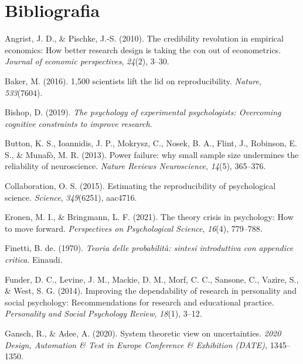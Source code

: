 \documentclass[
  letterpaper,
  DIV=11,
  numbers=noendperiod]{scrreprt}
\newlength{\cslhangindent}
\newenvironment{CSLReferences}[2] %
 {\begin{list}{}{%
  \setlength{\itemindent}{0pt}
  \setlength{\leftmargin}{0pt}
  \setlength{\parsep}{0pt}
  \ifodd #1
   \setlength{\leftmargin}{\cslhangindent}
   \setlength{\itemindent}{-1\cslhangindent}
  \fi
  \setlength{\itemsep}{#2\baselineskip}}}
 {\end{list}}
\theoremstyle{definition}
\theoremstyle{remark}
\begin{document}
\section*{Bibliografia}\label{bibliografia-4}


\label{refs}
\begin{CSLReferences}{1}{0}
Angrist, J. D., \& Pischke, J.-S. (2010). The credibility revolution in
empirical economics: How better research design is taking the con out of
econometrics. \emph{Journal of economic perspectives}, \emph{24}(2),
3--30.

Baker, M. (2016). 1,500 scientists lift the lid on reproducibility.
\emph{Nature}, \emph{533}(7604).

Bishop, D. (2019). \emph{The psychology of experimental psychologists:
Overcoming cognitive constraints to improve research}.

Button, K. S., Ioannidis, J. P., Mokrysz, C., Nosek, B. A., Flint, J.,
Robinson, E. S., \& Munafò, M. R. (2013). Power failure: why small
sample size undermines the reliability of neuroscience. \emph{Nature
Reviews Neuroscience}, \emph{14}(5), 365--376.

Collaboration, O. S. (2015). Estimating the reproducibility of
psychological science. \emph{Science}, \emph{349}(6251), aac4716.

Eronen, M. I., \& Bringmann, L. F. (2021). The theory crisis in
psychology: How to move forward. \emph{Perspectives on Psychological
Science}, \emph{16}(4), 779--788.

Finetti, B. de. (1970). \emph{Teoria delle probabilit{à}: sintesi
introduttiva con appendice critica}. Einaudi.

Funder, D. C., Levine, J. M., Mackie, D. M., Morf, C. C., Sansone, C.,
Vazire, S., \& West, S. G. (2014). Improving the dependability of
research in personality and social psychology: Recommendations for
research and educational practice. \emph{Personality and Social
Psychology Review}, \emph{18}(1), 3--12.

Gansch, R., \& Adee, A. (2020). System theoretic view on uncertainties.
\emph{2020 Design, Automation \& Test in Europe Conference \& Exhibition
(DATE)}, 1345--1350.


\end{CSLReferences}
\end{document}
